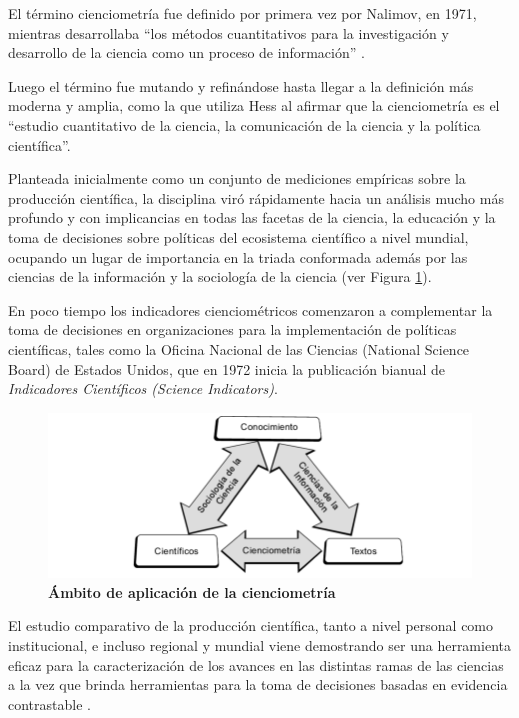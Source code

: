 El término cienciometría fue definido por primera vez por Nalimov, en 1971, mientras desarrollaba ``los métodos cuantitativos para la investigación y desarrollo de la ciencia como un proceso de información'' \cite{nalimov1971measurement}. 

Luego el término fue mutando y refinándose hasta llegar a la definición más moderna y amplia, como la que utiliza Hess \cite{hess1997science} al afirmar que la cienciometría es el ``estudio cuantitativo de la ciencia, la comunicación de la ciencia y la política científica''. 

Planteada inicialmente como un conjunto de mediciones empíricas sobre la producción científica, la disciplina viró rápidamente hacia un análisis mucho más profundo y con implicancias en todas las facetas de la ciencia, la educación y la toma de decisiones sobre políticas del ecosistema científico a nivel mundial, ocupando un lugar de importancia en la triada conformada además por las ciencias de la información y la sociología de la ciencia (ver Figura \ref{fig:ambito-cienciometria}\cite{munoz2017analisis}).

En poco tiempo los indicadores cienciométricos comenzaron a complementar la toma de decisiones en organizaciones para la implementación de políticas científicas, tales como la Oficina Nacional de las Ciencias (National Science Board) de Estados Unidos, que en 1972 inicia la publicación bianual de \textit{Indicadores Científicos (Science Indicators)}.

\begin{figure}[H]
	\centering
	\includegraphics[width=0.9\linewidth]{images/ambito-cienciometria}
	\caption{\textbf{Ámbito de aplicación de la cienciometría}} 
	\label{fig:ambito-cienciometria}
\end{figure}

El estudio comparativo de la producción científica, tanto a nivel personal como institucional, e incluso regional y mundial viene demostrando ser una herramienta eficaz para la caracterización de los avances en las distintas ramas de las ciencias a la vez que brinda herramientas para la toma de decisiones basadas en evidencia contrastable \cite{vinkler2008correlation,munoz2017analisis}. 

